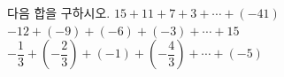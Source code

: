 다음 합을 구하시오.
 $15+11+7+3+\cdots+(-41)$
 $-12+(-9)+(-6)+(-3)+\cdots+15$
 $-\dfrac{1}{3}+\left(-\dfrac{2}{3}\right)+(-1)+\left(-\dfrac{4}{3}\right)+\cdots+(-5)$
